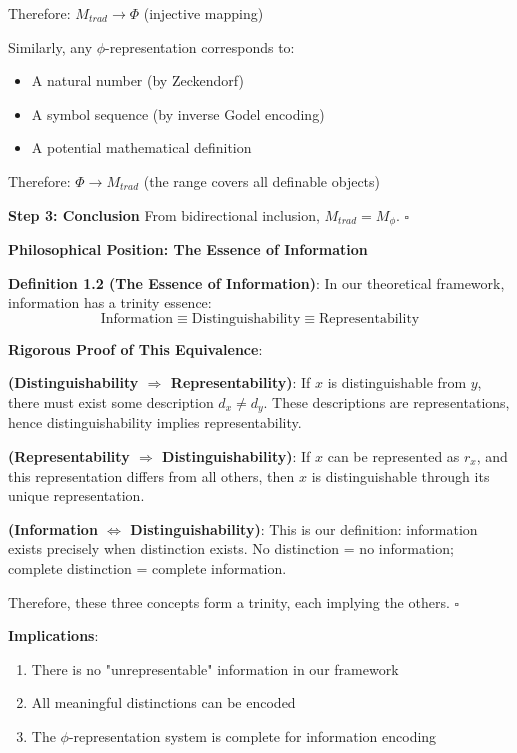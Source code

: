 Therefore: $M_{trad} \to \Phi$ (injective mapping)

Similarly, any $\phi$-representation corresponds to:
\begin{itemize}
\item A natural number (by Zeckendorf)
\item A symbol sequence (by inverse Godel encoding)
\item A potential mathematical definition
\end{itemize}

Therefore: $\Phi \to M_{trad}$ (the range covers all definable objects)

\textbf{Step 3: Conclusion}
From bidirectional inclusion, $M_{trad} = M_\phi$. $\square$

\textbf{Philosophical Position: The Essence of Information}

\textbf{Definition 1.2 (The Essence of Information)}:
\label{def:1.2}
In our theoretical framework, information has a trinity essence:
\begin{equation}
\text{Information} \equiv \text{Distinguishability} \equiv \text{Representability}
\end{equation}

\textbf{Rigorous Proof of This Equivalence}:

\textbf{(Distinguishability $\Rightarrow$ Representability)}:
If $x$ is distinguishable from $y$, there must exist some description $d_x \neq d_y$.
These descriptions are representations, hence distinguishability implies representability.

\textbf{(Representability $\Rightarrow$ Distinguishability)}:
If $x$ can be represented as $r_x$, and this representation differs from all others,
then $x$ is distinguishable through its unique representation.

\textbf{(Information $\Leftrightarrow$ Distinguishability)}:
This is our definition: information exists precisely when distinction exists.
No distinction = no information; complete distinction = complete information.

Therefore, these three concepts form a trinity, each implying the others. $\square$

\textbf{Implications}:
\begin{enumerate}
\item There is no "unrepresentable" information in our framework
\item All meaningful distinctions can be encoded
\item The $\phi$-representation system is complete for information encoding
\end{enumerate}

